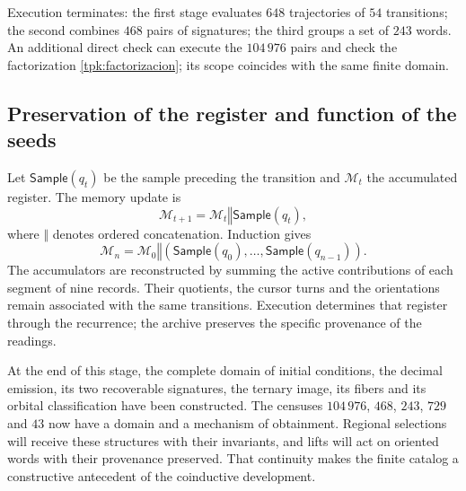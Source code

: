 Execution terminates: the first stage evaluates \(648\) trajectories of
\(54\) transitions; the second combines \(468\) pairs of signatures; the
third groups a set of \(243\) words. An additional direct
check can execute the \(104\,976\) pairs and check the
factorization \eqref{tpk:factorizacion}; its scope coincides with the same
finite domain.

\subsection{Preservation of the register and function of the seeds}
\label{tpk:conclusion}

Let \(\mathsf{Sample}(q_t)\) be the sample preceding the transition and
\(\mathcal M_t\) the accumulated register. The memory update is
\begin{equation}
 \mathcal M_{t+1}=\mathcal M_t\mathbin{\Vert}\mathsf{Sample}(q_t),
 \label{tpk:archivo}
\end{equation}
where \(\Vert\) denotes ordered concatenation. Induction gives
\[
 \mathcal M_n=\mathcal M_0\mathbin{\Vert}
 (\mathsf{Sample}(q_0),\ldots,\mathsf{Sample}(q_{n-1})).
\]
The accumulators are reconstructed by summing the active contributions of
each segment of nine records. Their quotients, the cursor turns and
the orientations remain associated with the same transitions.
Execution determines that register through the recurrence; the archive
preserves the specific provenance of the readings.

At the end of this stage, the complete domain of initial
conditions, the decimal emission, its two recoverable signatures, the ternary image,
its fibers and its orbital classification have been constructed. The censuses \(104\,976\), \(468\),
\(243\), \(729\) and \(43\) now have a domain and a mechanism of obtainment.
Regional selections will receive these structures with their invariants,
and lifts will act on oriented words with their provenance
preserved. That continuity makes the finite catalog a constructive
antecedent of the coinductive development.
